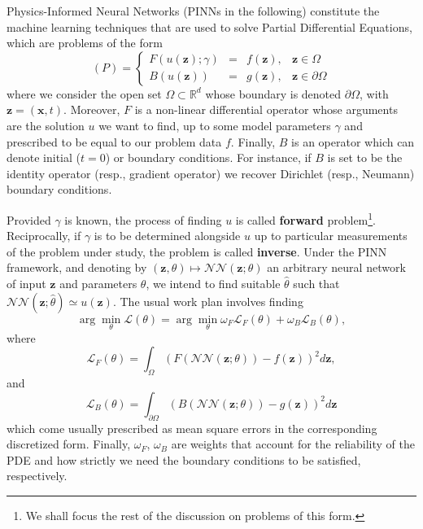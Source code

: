 \documentclass[12pt]{report} %
\newcommand{\tmmathbf}[1]{\ensuremath{\boldsymbol{#1}}}
\newcommand{\tmstrong}[1]{\textbf{#1}}
\begin{document}
Physics-Informed Neural Networks (PINNs in the following) constitute the
machine learning techniques that are used to solve Partial Differential
Equations, which are problems of the form
\begin{equation}
  (P) = \left\{\begin{array}{rlll}
    F (u (\tmmathbf{z}) ; \gamma) & = & f (\tmmathbf{z}), & \tmmathbf{z} \in
    \Omega                                                                            \\
    B (u (\tmmathbf{z}))          & = & g (\tmmathbf{z}), & \tmmathbf{z} \in \partial
    \Omega
  \end{array}\right. \label{pdegeneralform}
\end{equation}
where we consider the open set $\Omega \subset \mathbb{R}^d$ whose boundary is
denoted $\partial \Omega$, with $\tmmathbf{z}= (\tmmathbf{x}, t)$. Moreover,
\(F\) is a non-linear differential operator whose arguments are the solution $u$
we want to find, up to some model parameters $\gamma$ and prescribed to be
equal to our problem data \(f\). Finally, \(B\) is an operator which can denote
initial (\(t = 0\)) or boundary conditions. For instance, if $B$ is set to be
the identity operator (resp., gradient operator) we recover Dirichlet (resp.,
Neumann) boundary conditions.

Provided $\gamma$ is known, the process of finding $u$ is called
  {\tmstrong{forward}} problem\footnote{We shall focus the rest of the
  discussion on problems of this form.}. Reciprocally, if $\gamma$ is to be
determined alongside $u$ up to particular measurements of the problem under study, the problem is called {\tmstrong{inverse}}. Under
the PINN framework, and denoting by $(\tmmathbf{z}, \theta) \mapsto
  \mathcal{N}\mathcal{N} (\tmmathbf{z}; \theta)$ an arbitrary neural network of input $\tmmathbf{z}$ and
parameters $\theta$, we intend to find suitable $\hat{ \theta}$ such that
$\mathcal{N}\mathcal{N} (\tmmathbf{z}; \hat{ \theta}) \simeq u (\tmmathbf{z})$. The
usual work plan involves finding
\begin{equation}
  \arg \min_{\theta} \mathcal{L} (\theta) = \arg \min_{\theta} \omega_F
  \mathcal{L}_F (\theta) + \omega_B \mathcal{L}_B (\theta),
  \label{loss-fun-pinn}
\end{equation}
where
\begin{equation}
  \mathcal{L}_F (\theta) = \int_{\Omega} (F (\mathcal{N}\mathcal{N}
  (\tmmathbf{z}; \theta)) - f (\tmmathbf{z}))^2 d\tmmathbf{z},
  \label{loss-F}
\end{equation}
and
\begin{equation}
  \mathcal{L}_B (\theta) = \int_{\partial \Omega} (B (\mathcal{N}\mathcal{N}
  (\tmmathbf{z}; \theta)) - g (\tmmathbf{z}))^2 d\tmmathbf{z}
  \label{loss-boundary}
\end{equation}
which come usually prescribed as mean square errors in the corresponding
discretized form. Finally, $\omega_F$, $\omega_B$ are weights that account for the
reliability of the PDE and how strictly we need the boundary conditions to be
satisfied, respectively.
\end{document}
